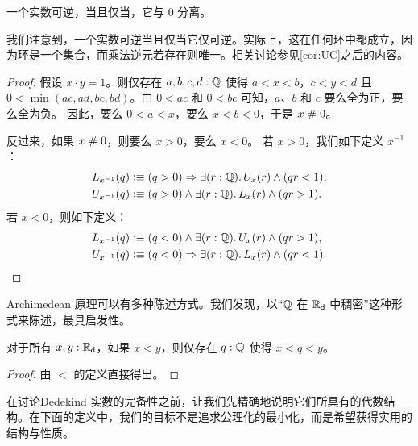 \begin{thm} \label{RD-inverse-apart-0}
  一个实数可逆，当且仅当，它与 $0$ 分离。
\end{thm}

\begin{rmk}
  我们注意到，一个实数可逆当且仅当它仅可逆。实际上，这在任何环中都成立，因为环是一个集合，而乘法逆元若存在则唯一。相关讨论参见\cref{cor:UC}之后的内容。
\end{rmk}

\begin{proof}
  假设 $x \cdot y = 1$。则仅存在 $a, b, c, d : \mathbb{Q}$ 使得 $a < x < b$，$c < y < d$ 且$0 < \min (a c, a d, b c, b d)$。由 $0 < a c$ 和 $0 < b c$ 可知，$a$、$b$ 和 $c$ 要么全为正，要么全为负。
  因此，要么 $0 < a < x$，要么 $x < b < 0$，于是 $x \mathrel{\#} 0$。

  反过来，如果 $x \mathrel{\#} 0$，则要么 $x > 0$，要么 $x < 0$。
  若 $x > 0$，我们如下定义 $x^{-1}$：
  \begin{align*}
    L_{x^{-1}}(q) &\defeq
    (q > 0) \Rightarrow \exis{r : \Q} U_x(r) \land (q r < 1),
    \\
    U_{x^{-1}}(q) &\defeq
    (q > 0) \land \exis{r : \Q} L_x(r) \land (q r > 1).
  \end{align*}
  若 $x < 0$，则如下定义：
  \begin{align*}
    L_{x^{-1}}(q) &\defeq
    (q < 0) \land \exis{r : \Q} U_x(r) \land (q r > 1),
    \\
    U_{x^{-1}}(q) &\defeq
    (q < 0) \Rightarrow \exis{r : \Q} L_x(r) \land (q r < 1). \qedhere
  \end{align*}
\end{proof}

%
%
%
Archimedean 原理可以有多种陈述方式。我们发现，以``$\mathbb{Q}$ 在 $\RD$ 中稠密''这种形式来陈述，最具启发性。

\begin{thm}[$\RD$ 的 Archimedean 原理] \label{RD-archimedean}
  对于所有 $x, y : \mathbb{R}_\mathsf{d}$，如果 $x < y$，则仅存在 $q : \mathbb{Q}$ 使得 $x < q < y$。
\end{thm}

\begin{proof}
  由 $<$ 的定义直接得出。
\end{proof}

在讨论Dedekind 实数的完备性之前，让我们先精确地说明它们所具有的代数结构。在下面的定义中，我们的目标不是追求公理化的最小化，而是希望获得实用的结构与性质。


